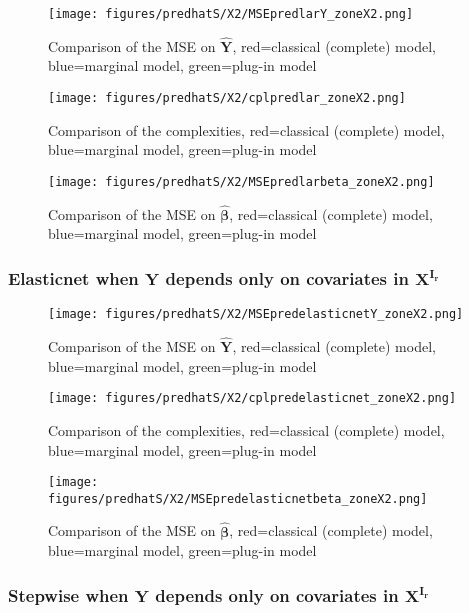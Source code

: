 \documentclass[12pt,a4paper]{report}
\begin{document}
	\begin{figure}[h!]
	\centering
		  \texttt{[image: figures/predhatS/X2/MSEpredlarY\_zoneX2.png]}
		\caption{Comparison of the MSE on $\hat{\boldsymbol{Y}}$, red=classical (complete) model, blue=marginal model, green=plug-in model}\label{MSEpredlarY_zoneX2}
	\end{figure}
	\begin{figure}[h!]
	\centering
		  \texttt{[image: figures/predhatS/X2/cplpredlar\_zoneX2.png]}
		\caption{Comparison of the complexities, red=classical (complete) model, blue=marginal model, green=plug-in model}\label{cplpredlar_zoneX2}
	\end{figure}
	\begin{figure}[h!]
	\centering
		  \texttt{[image: figures/predhatS/X2/MSEpredlarbeta\_zoneX2.png]}
		\caption{Comparison of the MSE on $\hat{\boldsymbol{\beta}}$, red=classical (complete) model, blue=marginal model, green=plug-in model}\label{MSEpredlarbeta_zoneX2}
	\end{figure}
	\FloatBarrier
\newpage
\subsubsection{Elasticnet when $\boldsymbol{Y}$ depends only on covariates in $\boldsymbol{X^{I_r}}$}

	\begin{figure}[h!]
	\centering
		  \texttt{[image: figures/predhatS/X2/MSEpredelasticnetY\_zoneX2.png]}
		\caption{Comparison of the MSE on $\hat{\boldsymbol{Y}}$, red=classical (complete) model, blue=marginal model, green=plug-in model}\label{MSEpredelasticnetY_zoneX2}
	\end{figure}
	\begin{figure}[h!]
	\centering
		  \texttt{[image: figures/predhatS/X2/cplpredelasticnet\_zoneX2.png]}
		\caption{Comparison of the complexities, red=classical (complete) model, blue=marginal model, green=plug-in model}\label{cplpredelasticnet_zoneX2}
	\end{figure}
	\begin{figure}[h!]
	\centering
		  \texttt{[image: figures/predhatS/X2/MSEpredelasticnetbeta\_zoneX2.png]}
		\caption{Comparison of the MSE on $\hat{\boldsymbol{\beta}}$, red=classical (complete) model, blue=marginal model, green=plug-in model}\label{MSEpredelasticnetbeta_zoneX2}
	\end{figure}
	\FloatBarrier
\newpage
\subsubsection{Stepwise when $\boldsymbol{Y}$ depends only on covariates in $\boldsymbol{X^{I_r}}$}
\end{document}
